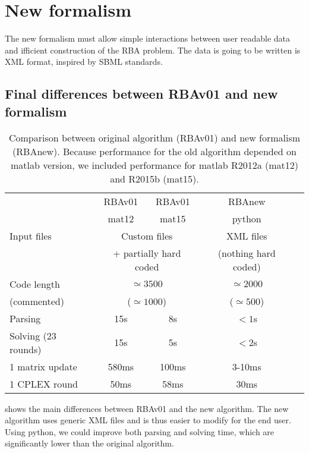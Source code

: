 \section{New formalism}

The new formalism must allow simple interactions between user readable data and ifficient construction of the RBA problem. The data is going to be written is XML format, inspired by SBML standards.

\subsection{Final differences between RBAv01 and new formalism}

\begin{table}[!h]
  \centering
  \begin{tabular}{|l|c|c|c|c|}
    \hline
           & RBAv01 & RBAv01 & RBAnew \\
           & mat12  & mat15  & python \\
    \hline
    Input files & \multicolumn{2}{c|}{Custom files} & XML files \\
    & \multicolumn{2}{c|}{+ partially hard coded} & (nothing hard coded) \\
    \hline
    Code length & \multicolumn{2}{c|}{$\simeq 3500$} & $\simeq 2000$ \\
    (commented) & \multicolumn{2}{c|}{($\simeq 1000$)} & ($\simeq 500$) \\
    \hline
    Parsing & 15s & 8s & $<1$s \\
    \hline
    Solving (23 rounds) & 15s & 5s & $<2$s \\
    \hline
    1 matrix update & 580ms & 100ms & 3-10ms \\
    \hline
    1 CPLEX round & 50ms & 58ms & 30ms \\
    \hline
  \end{tabular}
  \caption{Comparison between original algorithm (RBAv01) and new formalism (RBAnew). Because performance for the old algorithm depended on matlab version, we included performance for matlab R2012a (mat12) and R2015b (mat15).}
  \label{tab:new_old_comparison}
\end{table}

 shows the main differences between RBAv01 and the new algorithm. The new algorithm uses generic XML files and is thus easier to modify for the end user. Using python, we could improve both parsing and solving time, which are significantly lower than the original algorithm.

